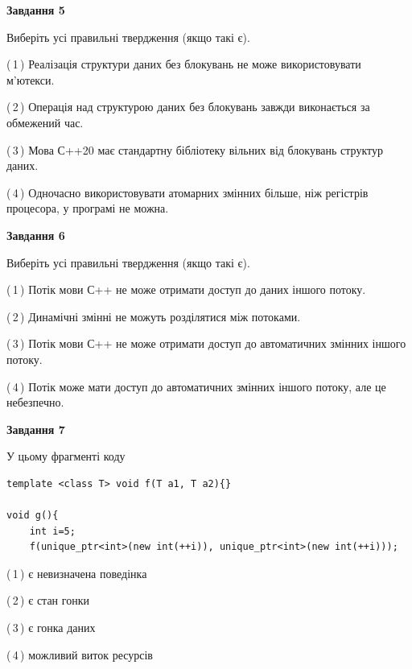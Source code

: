 \documentclass[12pt, ukrainian]{article}
\begin{document}
\begin {large}
{\begin{center}
\textbf{Завдання 5}
\end{center}

Виберіть усі правильні твердження (якщо такі є).\par
\vspace{2mm}

(\,1\,) Реалізація структури даних без блокувань не може використовувати м’ютекси.%

(\,2\,) Операція над структурою даних без блокувань завжди виконається за обмежений час.%

(\,3\,) Мова С++20 має стандартну бібліотеку вільних від блокувань структур даних.%

(\,4\,) Одночасно використовувати атомарних змінних більше, ніж регістрів процесора, у програмі не можна.%
\newpage


\begin{center}
\textbf{Завдання 6}
\end{center}

Виберіть усі правильні твердження (якщо такі є).\par
\vspace{2mm}

(\,1\,) Потік мови С++ не може отримати доступ до даних іншого потоку.%

(\,2\,) Динамічні змінні не можуть розділятися між потоками.%

(\,3\,) Потік мови С++ не може отримати доступ до автоматичних змінних іншого потоку.%

(\,4\,) Потік може мати доступ до автоматичних змінних іншого потоку, але це небезпечно.%


\begin{center}
\textbf{Завдання 7}
\end{center}

У цьому фрагменті коду
\begin{verbatim}
template <class T> void f(T a1, T a2){}

void g(){
    int i=5;
    f(unique_ptr<int>(new int(++i)), unique_ptr<int>(new int(++i)));
\end{verbatim}

(\,1\,) є невизначена поведінка%

(\,2\,) є стан гонки%

(\,3\,) є гонка даних%

(\,4\,) можливий виток ресурсів%

}
\end {large}

\vspace{4mm}
\newpage
\end{document}

